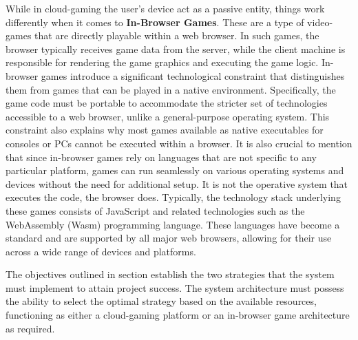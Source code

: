 While in cloud-gaming the user's device act as a passive entity, things work differently when it comes to \textbf{In-Browser Games}. These are a type of video-games that are directly playable within a web browser. In such games, the browser typically receives game data from the server, while the client machine is responsible for rendering the game graphics and executing the game logic.
In-browser games introduce a significant technological constraint that distinguishes them from games that can be played in a native environment. Specifically, the game code must be portable to accommodate the stricter set of technologies accessible to a web browser, unlike a general-purpose operating system.
This constraint also explains why most games available as native executables for consoles or PCs cannot be executed within a browser. It is also crucial to mention that since in-browser games rely on languages that are not specific to any particular platform, games can run seamlessly on various operating systems and devices without the need for additional setup. It is not the operative system that executes the code, the browser does.
Typically, the technology stack underlying these games consists of JavaScript and related technologies such as the WebAssembly (Wasm) programming language. These languages have become a standard and are supported by all major web browsers, allowing for their use across a wide range of devices and platforms.

The objectives outlined in section  establish the two strategies that the system must implement to attain project success. The system architecture must possess the ability to select the optimal strategy based on the available resources, functioning as either a cloud-gaming platform or an in-browser game architecture as required.
